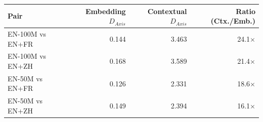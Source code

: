 \begin{tabular}{@{}lrrr@{}}
\toprule
Pair & Embedding $D_{Axis}$ & Contextual $D_{Axis}$ & Ratio (Ctx./Emb.) \\
\midrule
EN-100M vs EN+FR & 0.144 & 3.463 & 24.1$\times$ \\
EN-100M vs EN+ZH & 0.168 & 3.589 & 21.4$\times$ \\
EN-50M vs EN+FR & 0.126 & 2.331 & 18.6$\times$ \\
EN-50M vs EN+ZH & 0.149 & 2.394 & 16.1$\times$ \\
\bottomrule
\end{tabular}
